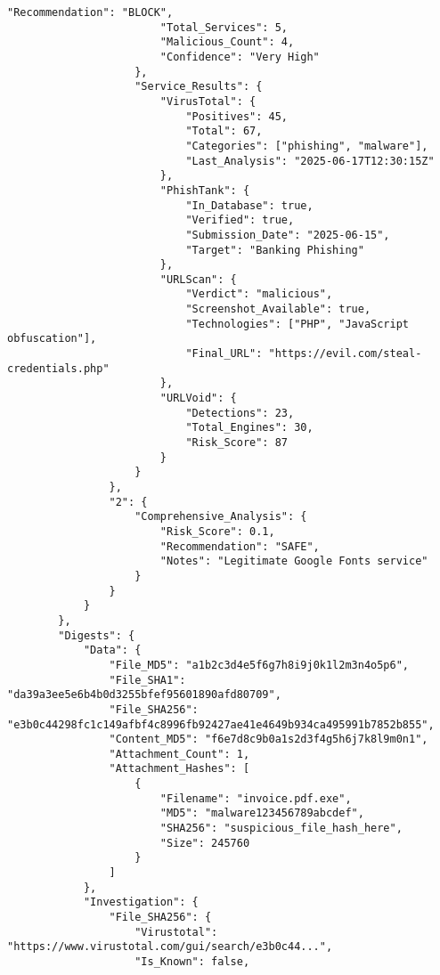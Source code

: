 \documentclass{article}
\begin{document}
\begin{lstlisting}[caption=Esempio output JSON dettagliato]
                        "Recommendation": "BLOCK",
                        "Total_Services": 5,
                        "Malicious_Count": 4,
                        "Confidence": "Very High"
                    },
                    "Service_Results": {
                        "VirusTotal": {
                            "Positives": 45,
                            "Total": 67,
                            "Categories": ["phishing", "malware"],
                            "Last_Analysis": "2025-06-17T12:30:15Z"
                        },
                        "PhishTank": {
                            "In_Database": true,
                            "Verified": true,
                            "Submission_Date": "2025-06-15",
                            "Target": "Banking Phishing"
                        },
                        "URLScan": {
                            "Verdict": "malicious",
                            "Screenshot_Available": true,
                            "Technologies": ["PHP", "JavaScript obfuscation"],
                            "Final_URL": "https://evil.com/steal-credentials.php"
                        },
                        "URLVoid": {
                            "Detections": 23,
                            "Total_Engines": 30,
                            "Risk_Score": 87
                        }
                    }
                },
                "2": {
                    "Comprehensive_Analysis": {
                        "Risk_Score": 0.1,
                        "Recommendation": "SAFE",
                        "Notes": "Legitimate Google Fonts service"
                    }
                }
            }
        },
        "Digests": {
            "Data": {
                "File_MD5": "a1b2c3d4e5f6g7h8i9j0k1l2m3n4o5p6",
                "File_SHA1": "da39a3ee5e6b4b0d3255bfef95601890afd80709", 
                "File_SHA256": "e3b0c44298fc1c149afbf4c8996fb92427ae41e4649b934ca495991b7852b855",
                "Content_MD5": "f6e7d8c9b0a1s2d3f4g5h6j7k8l9m0n1",
                "Attachment_Count": 1,
                "Attachment_Hashes": [
                    {
                        "Filename": "invoice.pdf.exe",
                        "MD5": "malware123456789abcdef",
                        "SHA256": "suspicious_file_hash_here",
                        "Size": 245760
                    }
                ]
            },
            "Investigation": {
                "File_SHA256": {
                    "Virustotal": "https://www.virustotal.com/gui/search/e3b0c44...",
                    "Is_Known": false,

\end{lstlisting}
\end{document}
